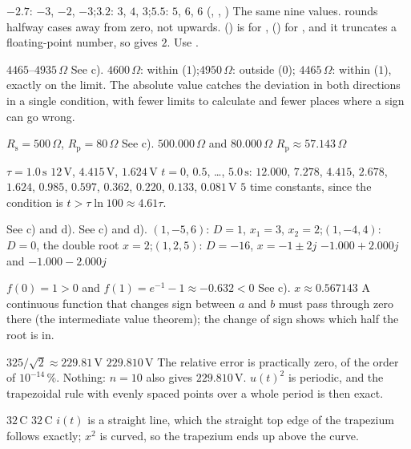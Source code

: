 \begin{facit}
  $-2.7$: $-3$, $-2$, $-3$;\enspace $3.2$: $3$, $4$, $3$;\enspace $5.5$: $5$,
$6$, $6$ (, , )
 The same nine values.
  rounds halfway cases away from zero, not upwards.
  () is for ,  () for
, and it truncates a floating-point number, so  gives $2$. Use
.

  $4465$--$4935\,\Omega$
 See c).
 $4600\,\Omega$: within ($1$);\enspace $4950\,\Omega$: outside ($0$);\enspace
$4465\,\Omega$: within ($1$), exactly on the limit.
 The absolute value catches the deviation in both directions in a single condition, with
fewer limits to calculate and fewer places where a sign can go wrong.

  $R_{\text{s}} = 500\,\Omega$, $R_{\text{p}} = 80\,\Omega$
 See c).
 $500.000\,\Omega$ and $80.000\,\Omega$
 $R_{\text{p}} \approx 57.143\,\Omega$

  $\tau = 1.0\,\text{s}$
 $12\,\text{V}$, $4.415\,\text{V}$, $1.624\,\text{V}$
 $t = 0$, $0.5$, \ldots, $5.0\,\text{s}$: $12.000$, $7.278$, $4.415$, $2.678$, $1.624$,
$0.985$, $0.597$, $0.362$, $0.220$, $0.133$, $0.081\,\text{V}$
 $5$ time constants, since the condition is $t > \tau \ln 100 \approx 4.61\tau$.

  See c) and d).  See c) and d).
 $(1, -5, 6)$: $D = 1$, $x_1 = 3$, $x_2 = 2$;\enspace $(1, -4, 4)$: $D = 0$, the double
root $x = 2$;\enspace $(1, 2, 5)$: $D = -16$, $x = -1 \pm 2j$
 $-1.000 + 2.000j$ and $-1.000 - 2.000j$

  $f(0) = 1 > 0$ and $f(1) = e^{-1} - 1 \approx -0.632 < 0$
 See c).
 $x \approx 0.567143$
 A continuous function that changes sign between $a$ and $b$ must pass through zero there
(the intermediate value theorem); the change of sign shows which half the root is in.

  $325/\sqrt{2} \approx 229.81\,\text{V}$
 $229.810\,\text{V}$
 The relative error is practically zero, of the order of $10^{-14}\,\%$.
 Nothing: $n = 10$ also gives $229.810\,\text{V}$. $u(t)^2$ is periodic, and the
trapezoidal rule with evenly spaced points over a whole period is then exact.

  $32\,\text{C}$  $32\,\text{C}$
 $i(t)$ is a straight line, which the straight top edge of the trapezium follows exactly;
$x^2$ is curved, so the trapezium ends up above the curve.


\end{facit}
